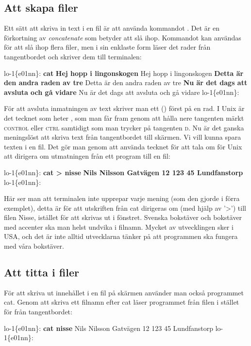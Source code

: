 \documentclass[a4paper,twocolumn]{book}
\begin{document}
\subsection{Att skapa filer}

Ett sätt att skriva in text i en fil är att använda kommandot
. Det är en förkortning av \emph{concatenate} som betyder
att slå ihop. Kommandot kan användas för att slå ihop flera filer, men
i sin enklaste form läser det rader från tangentbordet och skriver dem
till terminalen:
\begin{example}
lo-1\{e01nn\}: \textbf{cat}
\textbf{Hej hopp i lingonskogen}
Hej hopp i lingonskogen
\textbf{Detta är den andra raden av tre}
Detta är den andra raden av tre
\textbf{Nu är det dags att avsluta och gå vidare}
Nu är det dags att avsluta och gå vidare
\textbf{}
lo-1\{e01nn\}: 
\end{example}
För att avsluta inmatningen av text skriver man ett
 () först på en rad. I
Unix är det tecknet som heter , som man får fram genom att
hålla nere tangenten märkt\label{control} \textsc{control} eller
\textsc{ctrl} samtidigt som man trycker på tangenten \textsc{d}.
Nu är det ganska meningslöst att skriva text från tangentbordet till
skärmen. Vi vill kunna spara texten i en fil. Det gör man genom att
använda tecknet \ttindex{>} för att tala om för Unix att dirigera om
utmatningen från ett program till en fil:
\begin{example}
lo-1\{e01nn\}: \textbf{cat > nisse}
\textbf{Nils Nilsson
Gatvägen 12
123 45 Lundfanstorp}
\textbf{}
lo-1\{e01nn\}: 
\end{example}
Här ser man att terminalen inte upprepar varje mening (som den gjorde i förra exemplet), detta är för att
utskriften från cat dirigeras om (med hjälp av '>') till filen Nisse, istället för att skrivas ut i fönstret.  
Svenska bokstäver och bokstäver med accenter
ska man helst undvika i filnamn. Mycket av utvecklingen sker i USA, och det är
inte alltid utvecklarna tänker på att programmen ska fungera med våra
bokstäver.


\subsection{Att titta i filer}

För att skriva ut innehållet i en fil på skärmen använder man också
programmet cat. Genom att skriva ett filnamn efter cat läser
programmet från filen i stället för från tangentbordet:
\begin{example}
lo-1\{e01nn\}: \textbf{cat nisse}
Nils Nilsson
Gatvägen 12
123 45 Lundfanstorp
lo-1\{e01nn\}: 
\end{example}
\end{document}
